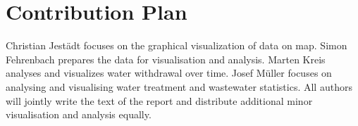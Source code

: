\documentclass{article}
\theoremstyle{plain}
\theoremstyle{definition}
\theoremstyle{remark}
\begin{document}
\section{Contribution Plan}
Christian Jestädt focuses on the graphical visualization of data on map. Simon Fehrenbach prepares the data for visualisation and analysis. Marten Kreis analyses and visualizes water withdrawal over time. Josef Müller focuses on analysing and visualising water treatment and wastewater statistics. All authors will jointly write the text of the report and distribute additional minor visualisation and analysis equally.





\end{document}
